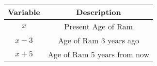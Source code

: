 \begin{center}
\begin{tabular}[12pt]{ |c| c|}
    \hline
    \textbf{Variable} & \textbf{Description}\\ 
    \hline
    $x$ & Present Age of Ram\\
    \hline   
    $x-3$ & Age of Ram 3 years ago \\
    \hline
    $x+5$ & Age of Ram 5 years from now \\
    \hline
    \end{tabular}
\end{center}